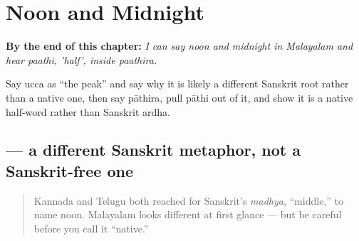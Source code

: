 
\chapter{Noon and Midnight}
\label{ch:ml-noon-and-midnight}

\begin{chapteropening}
\textbf{By the end of this chapter:} \emph{I can say noon and midnight in Malayalam and hear paathi, 'half', inside paathira.}

Say ucca as \textquotedblleft{}the peak\textquotedblright{} and say why it is likely a different Sanskrit root rather than a native one, then say pāthira, pull pāthi out of it, and show it is a native half-word rather than Sanskrit ardha.
\end{chapteropening}

\section[\texorpdfstring{\ml{ഉച്ച} (ucca)}{ഉച്ച (ucca)}]{ — a different Sanskrit metaphor, not a Sanskrit-free one}

\label{lesson:ML-C17-ucha-paathira}



\begin{quote}
Kannada and Telugu both reached for Sanskrit's \emph{madhya}, \textquotedblleft{}middle,\textquotedblright{} to name noon. Malayalam looks different at first glance — but be careful before you call it \textquotedblleft{}native.\textquotedblright{}
\end{quote}

